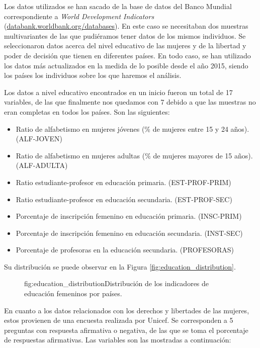 \documentclass[tfg,cienciasbased,lot,lof,covers,final,overleaf,nocopyright]{tfgtfmthesisuam}
\begin{document}
Los datos utilizados se han sacado de la base de datos del Banco Mundial correspondiente a \textit{World Development Indicators} (\url{databank.worldbank.org/databases}). En este caso se necesitaban dos muestras multivariantes de las que pudiéramos tener datos de los mismos individuos. Se seleccionaron datos acerca del nivel educativo de las mujeres y de la libertad y poder de decisión que tienen en diferentes países. En todo caso, se han utilizado los datos más actualizados en la medida de lo posible desde el año 2015, siendo los países los individuos sobre los que haremos el análisis.

Los datos a nivel educativo encontrados en un inicio fueron un total de 17 variables, de las que finalmente nos quedamos con 7 debido a que las muestras no eran completas en todos los países. Son las siguientes:

\begin{itemize}
    \item Ratio de alfabetismo en mujeres jóvenes (\% de mujeres entre 15 y 24 años). (ALF-JOVEN)
    \item Ratio de alfabetismo en mujeres adultas (\% de mujeres mayores de 15 años). (ALF-ADULTA)
    \item Ratio estudiante-profesor en educación primaria. (EST-PROF-PRIM)
    \item Ratio estudiante-profesor en educación secundaria. (EST-PROF-SEC)
    \item Porcentaje de inscripción femenino en educación primaria. (INSC-PRIM)
    \item Porcentaje de inscripción femenino en educación secundaria. (INST-SEC)
    \item Porcentaje de profesoras en la educación secundaria. (PROFESORAS)
\end{itemize}

Su distribución se puede observar en la Figura \ref{fig:education_distribution}.

\begin{figure}[Distribución de los indicadores de educación femeninos por países.]{fig:education_distribution}{Distribución de los indicadores de educación femeninos por países.}
\end{figure}

En cuanto a los datos relacionados con los derechos y libertades de las mujeres, estos provienen de una encuesta realizada por Unicef. Se corresponden a 5 preguntas con respuesta afirmativa o negativa, de las que se toma el porcentaje de respuestas afirmativas. Las variables son las mostradas a continuación:
\end{document}
